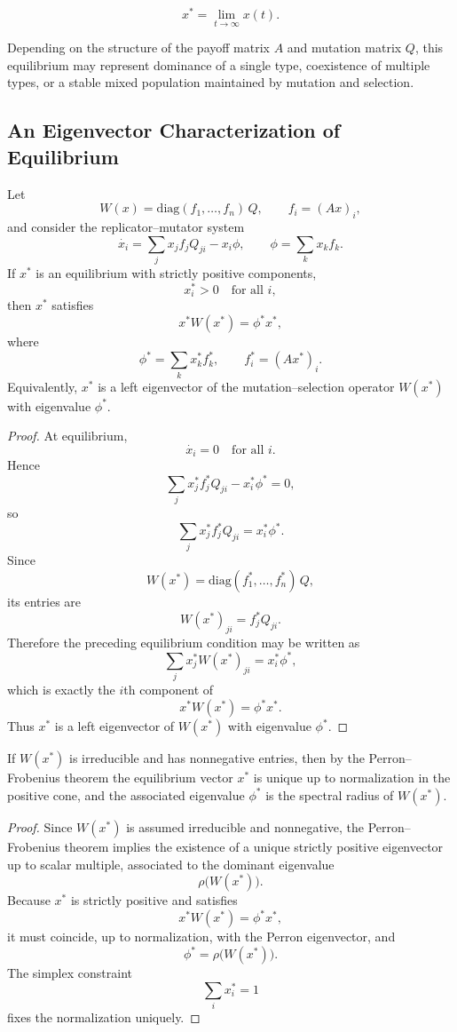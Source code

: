 \documentclass[12pt]{article}
\begin{document}
\[
x^* = \lim_{t \to \infty} x(t).
\]

Depending on the structure of the payoff matrix $A$ and mutation matrix $Q$, this equilibrium may represent dominance of a single type, coexistence of multiple types, or a stable mixed population maintained by mutation and selection.

\subsection{An Eigenvector Characterization of Equilibrium}

\begin{theorem}
Let
\[
W(x) = \mathrm{diag}(f_1,\dots,f_n)\,Q ,
\qquad
f_i=(Ax)_i ,
\]
and consider the replicator--mutator system
\[
\dot{x_i} = \sum_j x_j f_j Q_{ji} - x_i \phi ,
\qquad
\phi = \sum_k x_k f_k .
\]
If $x^*$ is an equilibrium with strictly positive components,
\[
x_i^*>0
\quad
\text{for all }i,
\]
then $x^*$ satisfies
\[
x^* W(x^*) = \phi^* x^* ,
\]
where
\[
\phi^* = \sum_k x_k^* f_k^* ,
\qquad
f_i^*=(Ax^*)_i .
\]
Equivalently, $x^*$ is a left eigenvector of the mutation--selection operator $W(x^*)$ with eigenvalue $\phi^*$.
\end{theorem}

\begin{proof}
At equilibrium,
\[
\dot{x_i}=0
\quad
\text{for all }i.
\]
Hence
\[
\sum_j x_j^* f_j^* Q_{ji} - x_i^* \phi^* = 0 ,
\]
so
\[
\sum_j x_j^* f_j^* Q_{ji} = x_i^* \phi^* .
\]
Since
\[
W(x^*) = \mathrm{diag}(f_1^*,\dots,f_n^*)\,Q ,
\]
its entries are
\[
W(x^*)_{ji} = f_j^* Q_{ji}.
\]
Therefore the preceding equilibrium condition may be written as
\[
\sum_j x_j^* W(x^*)_{ji} = x_i^* \phi^* ,
\]
which is exactly the $i$th component of
\[
x^* W(x^*) = \phi^* x^* .
\]
Thus $x^*$ is a left eigenvector of $W(x^*)$ with eigenvalue $\phi^*$.
\end{proof}

\begin{corollary}
If $W(x^*)$ is irreducible and has nonnegative entries, then by the Perron--Frobenius theorem the equilibrium vector $x^*$ is unique up to normalization in the positive cone, and the associated eigenvalue $\phi^*$ is the spectral radius of $W(x^*)$.
\end{corollary}

\begin{proof}
Since $W(x^*)$ is assumed irreducible and nonnegative, the Perron--Frobenius theorem implies the existence of a unique strictly positive eigenvector up to scalar multiple, associated to the dominant eigenvalue
\[
\rho\bigl(W(x^*)\bigr).
\]
Because $x^*$ is strictly positive and satisfies
\[
x^* W(x^*) = \phi^* x^* ,
\]
it must coincide, up to normalization, with the Perron eigenvector, and
\[
\phi^* = \rho\bigl(W(x^*)\bigr).
\]
The simplex constraint
\[
\sum_i x_i^* = 1
\]
fixes the normalization uniquely.
\end{proof}
\end{document}

